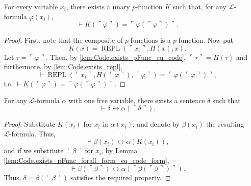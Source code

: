 \begin{lemma}
    \label{lem:Code.exists_pFunc_forall_form_eq_code_form}
    \leanok
    For every variable $x_i$, there exists a unary $p$-function $K$ such that, 
    for any $\mathcal{L}$-formula $\varphi(x_i)$,
    $$
    \vdash K (\ulcorner{\varphi}\urcorner) = 
    \ulcorner{\varphi(\ulcorner {\varphi} \urcorner)}\urcorner.
    $$
\end{lemma}

\begin{proof}
    First, note that the composite of $p$-functions is a $p$-function.
    Now put
    $$
    K(x) = \operatorname{REPL}(\ulcorner{x_i}\urcorner, H(x), x).
    $$
    Let $\tau = \ulcorner{\varphi}\urcorner$.
    Then, by \ref{lem:Code.exists_pFunc_eq_code}, $\ulcorner{\tau}\urcorner = H (\tau)$ and
    furthermore, by \ref{lem:Code.exists_repl},
    $$
    \vdash \operatorname{REPL}(\ulcorner{x_i}\urcorner, H(\ulcorner{\varphi}\urcorner), 
    \ulcorner{\varphi}\urcorner) = \ulcorner{\varphi(\ulcorner {\varphi} \urcorner)}\urcorner,
    $$
    i.e. $\vdash K (\ulcorner{\varphi}\urcorner)=
    \ulcorner{\varphi(\ulcorner {\varphi} \urcorner)}\urcorner$.
\end{proof}

\begin{theorem}
    \label{thm:diagonal}
    \leanok
    For any $\mathcal{L}$-formula $\alpha$ with one free variable, 
    there exists a sentence $\delta$ such that 
    $$
    \vdash \delta \leftrightarrow \alpha(\ulcorner{\delta}\urcorner).
    $$
\end{theorem}

\begin{proof}
    Substitute $K(x_i)$ for $x_i$ in $\alpha(x_i)$, 
    and denote by $\beta(x_i)$ the resulting $\mathcal{L}$-formula.
    Thus,
    $$
    \vdash \beta(x_i) \leftrightarrow \alpha(K(x_i)),
    $$
    and if we substitute $\ulcorner{\beta}\urcorner$ for $x_i$, 
    by Lemma \ref{lem:Code.exists_pFunc_forall_form_eq_code_form},
    $$
    \vdash \beta(\ulcorner{\beta}\urcorner) \leftrightarrow 
    \alpha(\ulcorner{\beta(\ulcorner{\beta}\urcorner)}\urcorner).
    $$
    Thus, $\delta = \beta(\ulcorner{\beta}\urcorner)$ satisfies the required property.
\end{proof}

